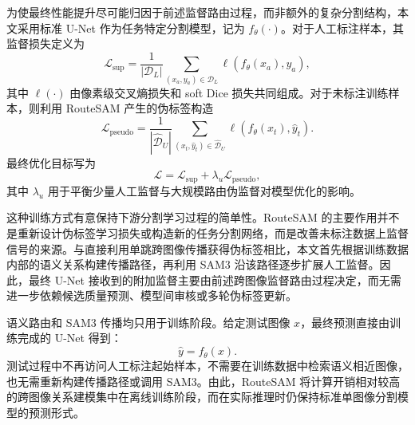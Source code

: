 \documentclass[UTF8,a4paper,10pt]{ctexart}
\begin{document}
为使最终性能提升尽可能归因于前述监督路由过程，而非额外的复杂分割结构，本文采用标准 U-Net 作为任务特定分割模型，记为 $f_{\theta}(\cdot)$。对于人工标注样本，其监督损失定义为
\begin{equation}
\mathcal{L}_{\mathrm{sup}}
=
\frac{1}{|\mathcal{D}_{L}|}
\sum_{(x_a,y_a)\in\mathcal{D}_{L}}
\ell
\left(
f_{\theta}(x_a),
y_a
\right),
\end{equation}
其中 $\ell(\cdot)$ 由像素级交叉熵损失和 soft Dice 损失共同组成。对于未标注训练样本，则利用 RouteSAM 产生的伪标签构造
\begin{equation}
\mathcal{L}_{\mathrm{pseudo}}
=
\frac{1}{|\widehat{\mathcal{D}}_{U}|}
\sum_{(x_t,\widehat{y}_t)\in\widehat{\mathcal{D}}_{U}}
\ell
\left(
f_{\theta}(x_t),
\widehat{y}_t
\right).
\end{equation}
最终优化目标写为
\begin{equation}
\mathcal{L}
=
\mathcal{L}_{\mathrm{sup}}
+
\lambda_{u}
\mathcal{L}_{\mathrm{pseudo}},
\end{equation}
其中 $\lambda_{u}$ 用于平衡少量人工监督与大规模路由伪监督对模型优化的影响。

这种训练方式有意保持下游分割学习过程的简单性。RouteSAM 的主要作用并不是重新设计伪标签学习损失或构造新的任务分割网络，而是改善未标注数据上监督信号的来源。与直接利用单跳跨图像传播获得伪标签相比，本文首先根据训练数据内部的语义关系构建传播路径，再利用 SAM3 沿该路径逐步扩展人工监督。因此，最终 U-Net 接收到的附加监督主要由前述跨图像监督路由过程决定，而无需进一步依赖候选质量预测、模型间审核或多轮伪标签更新。

语义路由和 SAM3 传播均只用于训练阶段。给定测试图像 $x$，最终预测直接由训练完成的 U-Net 得到：
\begin{equation}
\widehat{y}
=
f_{\theta}(x).
\end{equation}
测试过程中不再访问人工标注起始样本，不需要在训练数据中检索语义相近图像，也无需重新构建传播路径或调用 SAM3。由此，RouteSAM 将计算开销相对较高的跨图像关系建模集中在离线训练阶段，而在实际推理时仍保持标准单图像分割模型的预测形式。








\end{document}

